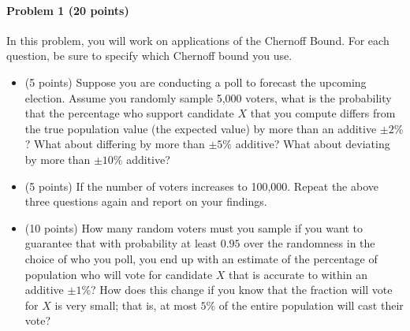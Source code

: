 \documentclass[11pt]{article}
\begin{document}
\paragraph{Problem 1 (20 points)}
In this problem, you will work on applications of the Chernoff Bound. For each question, be sure to specify which Chernoff bound you use.
\begin{itemize}
    \item (5 points) Suppose you are conducting a poll to forecast the upcoming election. Assume you randomly sample 5,000 voters, what is the probability that the percentage who support candidate $X$ that you compute differs from the true population value (the expected value) by more than an additive $\pm 2\%$? What about differing by more than $\pm 5\%$ additive? What about deviating by more than $\pm 10\%$ additive?
    
    \item (5 points) If the number of voters increases to 100,000. Repeat the above three questions again and report on your findings.
    
    \item (10 points) How many random voters must you sample if you want to guarantee that with probability at least $0.95$ over the randomness in the choice of who you poll, you end up with an estimate of the percentage of population who will vote for candidate $X$ that is accurate to within an additive $\pm 1\%$?
    How does this change if you know that the fraction will vote for $X$ is very small; that is, at most $5\%$ of the entire population will cast their vote?
\end{itemize}

\newpage
\end{document}
